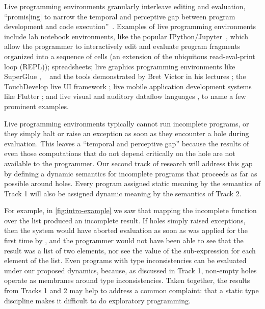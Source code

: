 
Live programming environments granularly interleave editing and evaluation,
``promis[ing] to narrow the temporal and perceptive gap 
between program development and code execution''~\cite{burckhardt2013s}.
Examples of live programming environments include {lab notebook environments},
like the popular IPython/Jupyter~\cite{PER-GRA:2007}, which allow the
programmer to interactively edit and evaluate program fragments organized into a
sequence of cells (an extension of the ubiquitous read-eval-print loop (REPL)); spreadsheets; {live graphics programming environments} like SuperGlue \cite{McDirmid:2007}, \sns{}~\cite{sns-pldi,sns-uist} and the tools demonstrated by Bret Victor in his lectures \cite{victor2012inventing}; the TouchDevelop live UI framework \cite{burckhardt2013s}; live mobile application development systems like Flutter \cite{flutter}; and live visual and auditory dataflow languages \cite{DBLP:conf/vl/BurnettAW98}, to name a few prominent examples. 


Live programming environments typically cannot run incomplete programs, or they simply halt or raise an exception as soon as they encounter a hole during evaluation. This leaves a ``temporal and perceptive gap'' because the results of even those computations that do not depend critically on the hole are not available to the programmer. Our second track of research will address this gap by defining a dynamic semantics for incomplete programs that proceeds as far as possible around holes. 
Every program assigned static meaning by the semantics of Track 1 will also be assigned dynamic meaning by the semantics of Track 2.

For example, in \autoref{fig:intro-example} we saw that mapping the incomplete function  over the  list produced an incomplete result. If holes simply raised exceptions, then the system would have aborted evaluation as soon as  was applied for the first time by , and the programmer would not have been able to see that the result was a list of two elements, nor see the value of the sub-expression  for each element  of the  list. Even programs with type inconsistencies can be evaluated under our proposed dynamics, because, as discussed in Track 1, non-empty holes operate as membranes around type inconsistencies. Taken together, the results from Tracks 1 and 2 may help to address a common complaint: that a static type discipline makes it difficult to do exploratory programming. 

